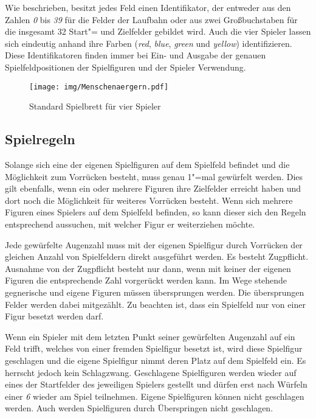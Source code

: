 \documentclass[
  name=\assignment,
  start=\releasedate,
  end=\duedate,
  subject=\lecture\,--\,\semester,
  group=\group,
  url=\theurl,
  author=\authors,
  mail=\themail
]{assignment}
\begin{document}
Wie beschrieben, besitzt jedes Feld einen Identifikator, der entweder aus den Zahlen \emph{0} bis \emph{39} für die Felder der Laufbahn oder aus zwei Großbuchstaben für die insgesamt 32 Start"= und Zielfelder gebildet wird. Auch die vier Spieler lassen sich eindeutig anhand ihre Farben (\emph{red}, \emph{blue}, \emph{green} und \emph{yellow}) identifizieren. Diese Identifikatoren finden immer bei Ein- und Ausgabe der genauen Spielfeldpositionen der Spielfiguren und der Spieler Verwendung.

\begin{figure}[h!]
\centering
\texttt{[image: img/Menschenaergern.pdf]}
\caption{Standard Spielbrett für vier Spieler\label{fig:Menschenaergern}}
\end{figure}

\subsection*{Spielregeln}
Solange sich eine der eigenen Spielfiguren auf dem Spielfeld befindet und die Möglichkeit zum Vorrücken besteht, muss genau 1"=mal gewürfelt werden. Dies gilt ebenfalls, wenn ein oder mehrere Figuren ihre Zielfelder erreicht haben und dort noch die Möglichkeit für weiteres Vorrücken besteht. Wenn sich mehrere Figuren eines Spielers auf dem Spielfeld befinden, so kann dieser sich den Regeln entsprechend aussuchen, mit welcher Figur er weiterziehen möchte.

Jede gewürfelte Augenzahl muss mit der eigenen Spielfigur durch Vorrücken der gleichen Anzahl von Spielfeldern direkt ausgeführt werden. Es besteht Zugpflicht. Ausnahme von der Zugpflicht besteht nur dann, wenn mit keiner der eigenen Figuren die entsprechende Zahl vorgerückt werden kann. Im Wege stehende gegnerische und eigene Figuren müssen übersprungen werden. Die übersprungen Felder werden dabei mitgezählt. Zu beachten ist, dass ein Spielfeld nur von einer Figur besetzt werden darf.

Wenn ein Spieler mit dem letzten Punkt seiner gewürfelten Augenzahl auf ein Feld trifft, welches von einer fremden Spielfigur besetzt ist, wird diese Spielfigur geschlagen und die eigene Spielfigur nimmt deren Platz auf dem Spielfeld ein. Es herrscht jedoch kein Schlagzwang. Geschlagene Spielfiguren werden wieder auf eines der Startfelder des jeweiligen Spielers gestellt und dürfen erst nach Würfeln einer \emph{6} wieder am Spiel teilnehmen. Eigene Spielfiguren können nicht geschlagen werden. Auch werden Spielfiguren durch Überspringen nicht geschlagen.
\end{document}

